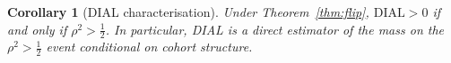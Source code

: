 \documentclass[11pt,a4paper]{article}
\newtheorem{corollary}[theorem]{Corollary}
\begin{document}
\begin{corollary}[DIAL characterisation]
\label{cor:dial}
Under Theorem~\ref{thm:flip}, $\mathrm{DIAL}>0$ if and only if
$\rho^2>\tfrac12$.  In particular, DIAL is a direct estimator of the
mass on the $\rho^2>\tfrac12$ event conditional on cohort structure.
\end{corollary}

\end{document}
